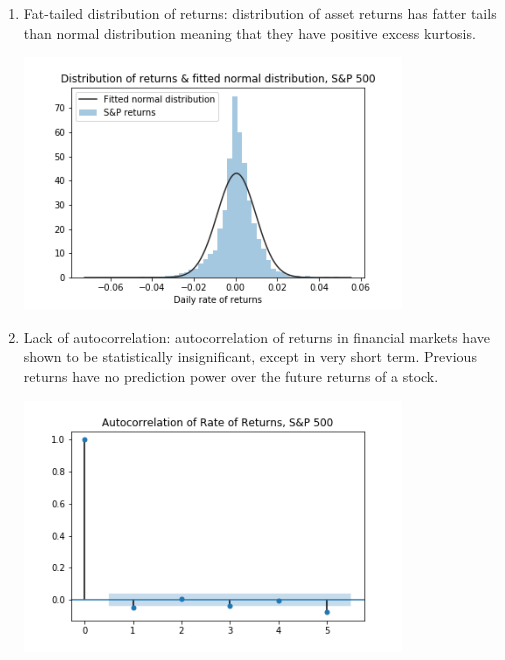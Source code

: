 \begin{enumerate}
    \item Fat-tailed distribution of returns: distribution of asset returns has fatter tails than normal distribution meaning that they have positive excess kurtosis. 
    \par
    \begin{minipage}{\linewidth}
        \centering
        \includegraphics[width=10cm]{plots/S&P500_fat_tails.png}
        \label{fig:sp_fat_tails}
    \end{minipage}

    \item Lack of autocorrelation: autocorrelation of returns in financial markets have shown to be statistically insignificant, except in very short term. Previous returns have no prediction power over the future returns of a stock. 
    \par
    \begin{minipage}{\linewidth}
        \centering
        \includegraphics[width=10cm]{plots/S&P500_autocorr.png}
        \label{fig:sp_autocorr}
    \end{minipage}


\end{enumerate}
